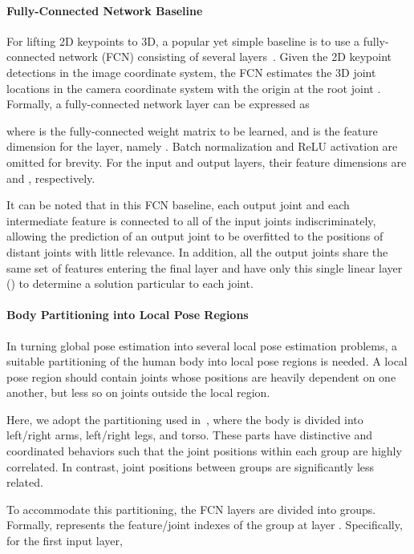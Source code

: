 \documentclass[runningheads]{llncs}
\begin{document}
\paragraph{\textbf{Fully-Connected Network Baseline}}


For lifting 2D keypoints to 3D, a popular yet simple baseline is to use a fully-connected network (FCN) consisting of several layers~\cite{martinez2017simple}. Given the 2D keypoint detections  in the image coordinate system, the FCN estimates the 3D joint locations  in the camera coordinate system with the origin at the root joint . Formally, a fully-connected network layer can be expressed as 

where  is the fully-connected weight matrix to be learned, and  is the feature dimension for the  layer, namely . Batch normalization and ReLU activation are omitted for brevity.
For the input and output layers, their feature dimensions are  and , respectively. 


It can be noted that in this FCN baseline, each output joint and each intermediate feature is connected to all of the input joints indiscriminately, allowing the prediction of an output joint to be overfitted to the positions of distant joints with little relevance. In addition, all the output joints share the same set of features entering the final layer and have only this single linear layer () to determine a solution particular to each joint.






\paragraph{\textbf{Body Partitioning into Local Pose Regions}}
\label{sec:modify}
In turning global pose estimation into several local pose estimation problems, a suitable partitioning of the human body into local pose regions is needed. A local pose region should contain joints whose positions are heavily dependent on one another, but less so on joints outside the local region.

Here, we adopt the partitioning used in~\cite{park20183d}, where the body is divided into left/right arms, left/right legs, and torso. These parts have distinctive and coordinated behaviors such that the joint positions within each group are highly correlated. In contrast, joint positions between groups are significantly less related.


To accommodate this partitioning, the FCN layers are divided into groups. Formally,  represents the feature/joint indexes of the  group at layer . Specifically, for the first input layer,
\end{document}
